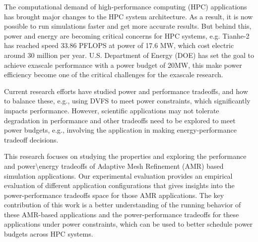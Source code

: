 The computational demand of high-performance computing (HPC) applications has brought major changes to the HPC system architecture. As a result, it is now possible to run simulations faster and get more accurate results. But behind this, power and energy are becoming critical concerns for HPC systems, e.g. Tianhe-2 has reached speed 33.86 PFLOPS at power of 17.6 MW\cite{wiki_tianhe}, which cost electric around 30 million per year\cite{2014tianhe}. U.S. Department of Energy (DOE) has set the goal to achieve exascale performance with a power budget of 20MW\cite{lucas2014doe}, this make power efficiency become one of the critical challenges for the exascale research.

Current research efforts have studied power and performance tradeoffs, and how to balance these, e.g., using DVFS to meet power constraints, which significantly impacts performance. However, scientific applications may not tolerate degradation in performance and other tradeoffs need to be explored to meet power budgets, e.g., involving the application in making energy-performance tradeoff decisions. 

This research focuses on studying the properties and exploring the performance and power\textbackslash energy tradeoffs of Adaptive Mesh Refinement (AMR) based simulation applications. Our experimental evaluation provides an empirical evaluation of different application configurations that gives insights into the power-performance tradeoffs space for those AMR applications. The key contribution of this work is a better understanding of the running behavior of these AMR-based applications and the power-performance tradeoffs for these applications under power constraints, which can be used to better schedule power budgets across HPC systems.\cite{david2010rapl}

